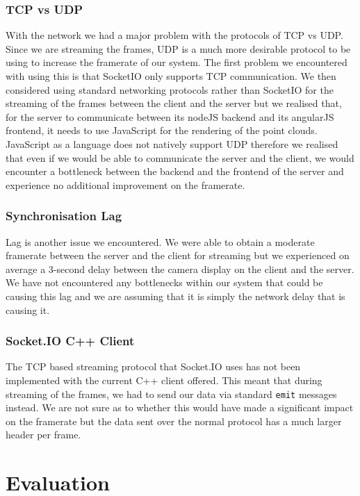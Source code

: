 \documentclass{article}
\begin{document}
\subsubsection{TCP vs UDP}
With the network we had a major problem with the protocols of TCP vs UDP. Since we are streaming the frames, UDP is a much more desirable protocol to be using to increase the framerate of our system. The first problem we encountered with using this is that SocketIO only supports TCP communication. We then considered using standard networking protocols rather than SocketIO for the streaming of the frames between the client and the server but we realised that, for the server to communicate between its nodeJS backend and its angularJS frontend, it needs to use JavaScript for the rendering of the point clouds. JavaScript as a language does not natively support UDP therefore we realised that even if we would be able to communicate the server and the client, we would encounter a bottleneck between the backend and the frontend of the server and experience no additional improvement on the framerate.
\subsubsection{Synchronisation Lag}
Lag is another issue we encountered. We were able to obtain a moderate framerate between the server and the client for streaming but we experienced on average a 3-second delay between the camera display on the client and the server. We have not encountered any bottlenecks within our system that could be causing this lag and we are assuming that it is simply the network delay that is causing it.
\subsubsection{Socket.IO C++ Client}
The TCP based streaming protocol that Socket.IO uses has not been implemented with the current C++ client offered.
This meant that during streaming of the frames, we had to send our data via standard \texttt{emit} messages instead. We are not sure as to whether this would have made a significant impact on the framerate but the data sent over the normal protocol has a much larger header per frame.

\newpage
\section{Evaluation}
\end{document}
